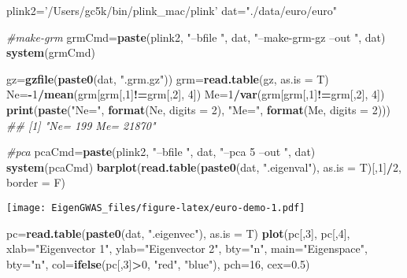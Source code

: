 \documentclass[]{book}
\newenvironment{Shaded}{\begin{snugshade}}{\end{snugshade}}
\newcommand{\CommentTok}[1]{\textcolor[rgb]{0.56,0.35,0.01}{\textit{#1}}}
\newcommand{\DataTypeTok}[1]{\textcolor[rgb]{0.13,0.29,0.53}{#1}}
\newcommand{\DecValTok}[1]{\textcolor[rgb]{0.00,0.00,0.81}{#1}}
\newcommand{\FloatTok}[1]{\textcolor[rgb]{0.00,0.00,0.81}{#1}}
\newcommand{\KeywordTok}[1]{\textcolor[rgb]{0.13,0.29,0.53}{\textbf{#1}}}
\newcommand{\NormalTok}[1]{#1}
\newcommand{\OperatorTok}[1]{\textcolor[rgb]{0.81,0.36,0.00}{\textbf{#1}}}
\newcommand{\StringTok}[1]{\textcolor[rgb]{0.31,0.60,0.02}{#1}}
\begin{document}
\begin{Shaded}
\begin{Highlighting}[]
\NormalTok{plink2=}\StringTok{'/Users/gc5k/bin/plink_mac/plink'}
\NormalTok{dat=}\StringTok{"./data/euro/euro"}

\CommentTok{#make-grm}
\NormalTok{grmCmd=}\KeywordTok{paste}\NormalTok{(plink2, }\StringTok{"--bfile "}\NormalTok{, dat, }\StringTok{"--make-grm-gz --out "}\NormalTok{, dat)}
\KeywordTok{system}\NormalTok{(grmCmd)}

\NormalTok{gz=}\KeywordTok{gzfile}\NormalTok{(}\KeywordTok{paste0}\NormalTok{(dat, }\StringTok{".grm.gz"}\NormalTok{))}
\NormalTok{grm=}\KeywordTok{read.table}\NormalTok{(gz, }\DataTypeTok{as.is =}\NormalTok{ T)}
\NormalTok{Ne=}\OperatorTok{-}\DecValTok{1}\OperatorTok{/}\KeywordTok{mean}\NormalTok{(grm[grm[,}\DecValTok{1}\NormalTok{]}\OperatorTok{!=}\NormalTok{grm[,}\DecValTok{2}\NormalTok{], }\DecValTok{4}\NormalTok{])}
\NormalTok{Me=}\DecValTok{1}\OperatorTok{/}\KeywordTok{var}\NormalTok{(grm[grm[,}\DecValTok{1}\NormalTok{]}\OperatorTok{!=}\NormalTok{grm[,}\DecValTok{2}\NormalTok{], }\DecValTok{4}\NormalTok{])}
\KeywordTok{print}\NormalTok{(}\KeywordTok{paste}\NormalTok{(}\StringTok{"Ne="}\NormalTok{, }\KeywordTok{format}\NormalTok{(Ne, }\DataTypeTok{digits =} \DecValTok{2}\NormalTok{), }\StringTok{"Me="}\NormalTok{, }\KeywordTok{format}\NormalTok{(Me, }\DataTypeTok{digits =} \DecValTok{2}\NormalTok{)))}
\CommentTok{## [1] "Ne= 199 Me= 21870"}

\CommentTok{#pca}
\NormalTok{pcaCmd=}\KeywordTok{paste}\NormalTok{(plink2, }\StringTok{"--bfile "}\NormalTok{, dat, }\StringTok{"--pca 5 --out "}\NormalTok{, dat)}
\KeywordTok{system}\NormalTok{(pcaCmd)}
\KeywordTok{barplot}\NormalTok{(}\KeywordTok{read.table}\NormalTok{(}\KeywordTok{paste0}\NormalTok{(dat, }\StringTok{".eigenval"}\NormalTok{), }\DataTypeTok{as.is =}\NormalTok{ T)[,}\DecValTok{1}\NormalTok{]}\OperatorTok{/}\DecValTok{2}\NormalTok{, }\DataTypeTok{border =}\NormalTok{ F)}
\end{Highlighting}
\end{Shaded}

\texttt{[image: EigenGWAS\_files/figure-latex/euro-demo-1.pdf]}

\begin{Shaded}
\begin{Highlighting}[]

\NormalTok{pc=}\KeywordTok{read.table}\NormalTok{(}\KeywordTok{paste0}\NormalTok{(dat, }\StringTok{".eigenvec"}\NormalTok{), }\DataTypeTok{as.is =}\NormalTok{ T)}
\KeywordTok{plot}\NormalTok{(pc[,}\DecValTok{3}\NormalTok{], pc[,}\DecValTok{4}\NormalTok{], }\DataTypeTok{xlab=}\StringTok{"Eigenvector 1"}\NormalTok{, }\DataTypeTok{ylab=}\StringTok{"Eigenvector 2"}\NormalTok{, }\DataTypeTok{bty=}\StringTok{"n"}\NormalTok{, }\DataTypeTok{main=}\StringTok{"Eigenspace"}\NormalTok{, }\DataTypeTok{bty=}\StringTok{"n"}\NormalTok{, }\DataTypeTok{col=}\KeywordTok{ifelse}\NormalTok{(pc[,}\DecValTok{3}\NormalTok{]}\OperatorTok{>}\DecValTok{0}\NormalTok{, }\StringTok{"red"}\NormalTok{, }\StringTok{"blue"}\NormalTok{), }\DataTypeTok{pch=}\DecValTok{16}\NormalTok{, }\DataTypeTok{cex=}\FloatTok{0.5}\NormalTok{)}
\end{Highlighting}
\end{Shaded}
\end{document}
